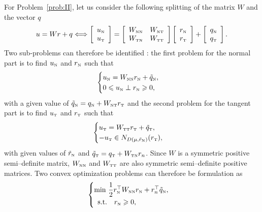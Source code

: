 For Problem~\ref{prob:II}, let us consider the following splitting of the matrix $W$ and the vector $q$
\begin{equation}
  \label{eq:W-split}
  u = W r +q \Longleftrightarrow 
  \left[\begin{array}{c}
    u_\n \\ u_\t
  \end{array}\right]
 =
  \left[\begin{array}{cc}
    W_{\n\n} &W_{\n\t} \\
    W_{\t\n} &W_{\t\t} \\    
  \end{array}\right]    \left[\begin{array}{c}
    r_\n\\ r_\t
  \end{array}\right]+
 \left[\begin{array}{c}
    q_\n \\q_\t
  \end{array}\right].
\end{equation}
Two sub-problems can therefore be identified : the first problem for the normal part is to find $u_{\hbox{\tiny{N}}}$ and $r_{\hbox{\tiny{N}}}$ such that
\begin{equation}
  \label{eq:AO-1}
  \begin{cases}
    u_\n = W_{\n\n} r_\n + \tilde q_\n, \\
    0\leq u_\n \perp r_\n \geq 0,
  \end{cases}
\end{equation}
with a given value of $\tilde q_{\hbox{\tiny{N}}} = q_{\hbox{\tiny{N}}} + W_{{\hbox{\tiny{N}}}{\hbox{\tiny{T}}}}r_{\hbox{\tiny{T}}}$ and the second problem for the tangent part is to find $u_{\hbox{\tiny{T}}}$ and $r_{\hbox{\tiny{T}}}$ such that
\begin{equation}
  \label{eq:AO-2}
  \begin{cases}
    u_\t = W_{\t\t} r_\t + \tilde q_\t, \\
   -u_\t \in N_{D(\mu,\tilde r_{\n})}(r_\t),
  \end{cases}
\end{equation}
with  given values of $\tilde r_{\hbox{\tiny{N}}}$ and $\tilde q_{\hbox{\tiny{T}}} = q_{\hbox{\tiny{T}}} + W_{{\hbox{\tiny{T}}}{\hbox{\tiny{N}}}}r_n$. Since $W$ is a symmetric positive semi--definite  matrix, $W_{{\hbox{\tiny{N}}}{\hbox{\tiny{N}}}}$ and $W_{{\hbox{\tiny{T}}}{\hbox{\tiny{T}}}}$ are also symmetric semi--definite positive matrices. Two convex optimization problems can therefore be formulation as
 \begin{equation}
  \label{eq:AO-3}
  \begin{cases}
    \min\, \Frac 1 2 r_\n^\top  W_{\n\n} r_\n + r_n^\top \tilde q_\n, \\
    \begin{array}{ll}
    \text{s.t.} & r_\n \geq 0,
  \end{array}\end{cases}
\end{equation}
